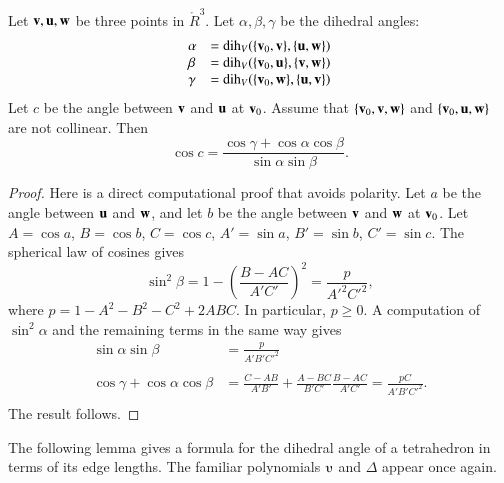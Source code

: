 \begin{lemma}
Let ${\mathbf v},{\mathbf u},{\mathbf w}$ be three points in $\ring{R}^3$.
Let $\alpha,\beta,\gamma$ be the dihedral angles: 
   $$
   \begin{array}{lll}
     \alpha &= \operatorname{dih}_V(\{{\mathbf v}_0,{\mathbf v}\},\{{\mathbf u},{\mathbf w}\})\\
     \beta &= \operatorname{dih}_V(\{{\mathbf v}_0,{\mathbf u}\},\{{\mathbf v},{\mathbf w}\})\\
     \gamma&= \operatorname{dih}_V(\{{\mathbf v}_0,{\mathbf w}\},\{{\mathbf u},{\mathbf v}\})\\
     \end{array}
   $$
Let $c$ be the
angle between ${\mathbf v}$ and ${\mathbf u}$ at ${\mathbf v}_0$. 
Assume that $\{{\mathbf v}_0,{\mathbf v},{\mathbf w}\}$ and $\{{\mathbf v}_0,{\mathbf u},{\mathbf w}\}$ are not collinear.
Then
    $$
    \cos c = \frac{\cos \gamma + \cos \alpha \cos \beta}
     {\sin \alpha\sin \beta}.
    $$
\end{lemma}
%
%

\begin{proof}  
Here is a direct
computational proof that avoids polarity.
Let $a$ be the angle between ${\mathbf u}$ and ${\mathbf w}$, and let $b$ be the angle
between ${\mathbf v}$ and ${\mathbf w}$ at ${\mathbf v}_0$.
Let $A=\cos a$, $B=\cos b$, $C=\cos c$,
$A'=\sin a$, $B'=\sin b$, $C'=\sin c$.  The
spherical law of cosines gives
   $$\sin^2\beta = 1-\left(\frac{B-A C}{A' C'}\right)^2
     = \frac{p}{A'^2 C'^2},$$
where $p=1-A^2 - B^2 - C^2 + 2 A B C$.
In particular, $p\ge 0$.
%
A computation of $\sin^2\alpha$ and the remaining terms in the same way gives
   $$
   \begin{array}{lll}
     \sin\alpha\sin\beta &= \frac{\displaystyle p}{\displaystyle A' B' C'^2}\\ 
      \\
     \cos\gamma + \cos\alpha \cos\beta &=
         \frac{\displaystyle C - A B}{\displaystyle A' B'} + \frac{\displaystyle A - B C}{\displaystyle B' C'} \frac{\displaystyle B - A C}{\displaystyle A' C'}
         = \frac{\displaystyle p C}{\displaystyle A' B' C'^2}.\\
   \end{array}
   $$
The result follows.
\end{proof}

The following lemma gives a formula for the dihedral angle
of a tetrahedron in terms of its edge lengths.  The
familiar polynomials $\ups$ and $\Delta$ appear once again.
%
%


